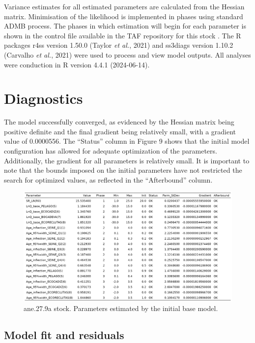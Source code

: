 \documentclass[
]{article}
\begin{document}
Variance estimates for all estimated parameters are calculated from the
Hessian matrix. Minimisation of the likelihood is implemented in phases
using standard ADMB process. The phases in which estimation will begin
for each parameter is shown in the control file available in the TAF
repository for this stock . The R packages r4ss version 1.50.0 (Taylor
\emph{et al.}, 2021) and ss3diags version 1.10.2 (Carvalho \emph{et
al.}, 2021) were used to process and view model outputs. All analyses
were conduction in R version 4.4.1 (2024-06-14).

\hypertarget{diagnostics}{%
\section{Diagnostics}\label{diagnostics}}

The model successfully converged, as evidenced by the Hessian matrix
being positive definite and the final gradient being relatively small,
with a gradient value of 0.0000556. The ``Status'' column in Figure 9
shows that the initial model configuration has allowed for adequate
optimization of the parameters. Additionally, the gradient for all
parameters is relatively small. It is important to note that the bounds
imposed on the initial parameters have not restricted the search for
optimized values, as reflected in the ``Afterbound'' column.

\begin{figure}[H]

{\centering \includegraphics[width=0.95\linewidth]{report/run/S1.0_4FLEETS/tb_params_est} 

}

\caption{ane.27.9a stock. Parameters estimated by the initial base model.}\label{fig:unnamed-chunk-13}
\end{figure}

\hypertarget{model-fit-and-residuals}{%
\subsection{Model fit and residuals}\label{model-fit-and-residuals}}
\end{document}
